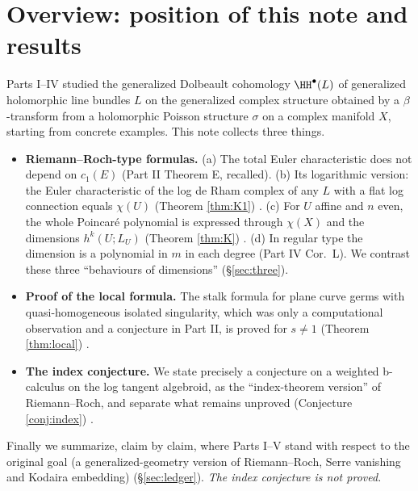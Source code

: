 \section{Overview: position of this note and results}
Parts I--IV studied the generalized Dolbeault cohomology $\HH^\bullet(L)$ of generalized holomorphic line bundles $L$ on the generalized complex structure obtained by a $\beta$-transform from a holomorphic Poisson structure $\sigma$ on a complex manifold $X$, starting from concrete examples. This note collects three things.

\begin{itemize}
\item \textbf{Riemann--Roch-type formulas.} (a) The total Euler characteristic does not depend on $c_1(E)$ (Part II Theorem E, recalled). (b) Its logarithmic version: the Euler characteristic of the log de Rham complex of any $L$ with a flat log connection equals $\chi(U)$ (Theorem \ref{thm:K1}) \tP. (c) For $U$ affine and $n$ even, the whole Poincar\'e polynomial is expressed through $\chi(X)$ and the dimensions $h^k(U;L_U)$ (Theorem \ref{thm:K}) \tP\tV. (d) In regular type the dimension is a polynomial in $m$ in each degree (Part IV Cor.\ L). We contrast these three ``behaviours of dimensions'' (\S\ref{sec:three}).
\item \textbf{Proof of the local formula.} The stalk formula for plane curve germs with quasi-homogeneous isolated singularity, which was only a computational observation and a conjecture in Part II, is proved for $s\neq1$ (Theorem \ref{thm:local}) \tP.
\item \textbf{The index conjecture.} We state precisely a conjecture on a weighted b-calculus on the log tangent algebroid, as the ``index-theorem version'' of Riemann--Roch, and separate what remains unproved (Conjecture \ref{conj:index}) \tK.
\end{itemize}
Finally we summarize, claim by claim, where Parts I--V stand with respect to the original goal (a generalized-geometry version of Riemann--Roch, Serre vanishing and Kodaira embedding) (\S\ref{sec:ledger}). \emph{The index conjecture is not proved.}

